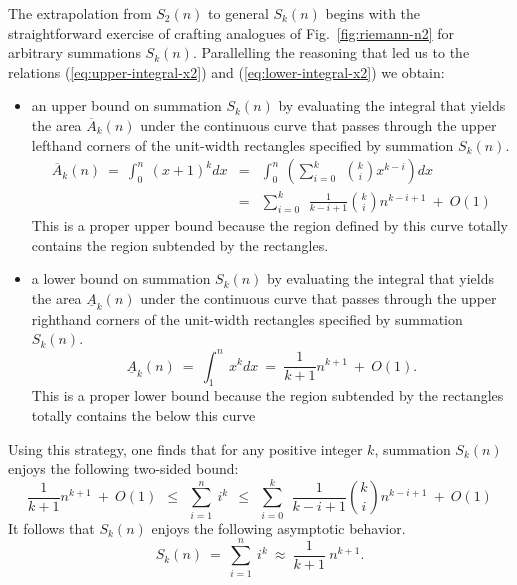 The extrapolation from $S_2(n)$ to general $S_k(n)$ begins with the
straightforward exercise of crafting analogues of
Fig.~\ref{fig:riemann-n2} for arbitrary summations $S_k(n)$.
Parallelling the reasoning that led us to the relations
(\ref{eq:upper-integral-x2}) and (\ref{eq:lower-integral-x2}) we
obtain:
\begin{itemize}
\item
an upper bound on summation $S_k(n)$ by evaluating the integral that
yields the area $\overline{A}_k(n)$ under the continuous curve that
passes through the upper lefthand corners of the unit-width rectangles
specified by summation $S_k(n)$.
\begin{eqnarray}
\label{eq:upper-integral-xk}
\overline{A}_k(n) \ = \
\int_0^n \ (x+1)^k dx & = &
\int_0^n \ \left(
\sum_{i=0}^k \ \ {k \choose i} x^{k-i} \right) dx \\
\nonumber
  & = &
\sum_{i=0}^k \ \ \frac{1}{k-i+1} {k \choose i} n^{k-i+1} \ + \ O(1)
\end{eqnarray}
This is a proper upper bound because the region defined by this curve
totally contains the region subtended by the rectangles.

\item
a lower bound on summation $S_k(n)$ by evaluating the integral that
yields the area $\underline{A}_k(n)$ under the continuous curve that
passes through the upper righthand corners of the unit-width
rectangles specified by summation $S_k(n)$.
\begin{equation}
\label{eq:lower-integral-xk}
\underline{A}_k(n) \ = \ 
\int_1^n \ x^k dx \ = \ \frac{1}{k+1} n^{k+1} \ + \ O(1).
\end{equation}
This is a proper lower bound because the region subtended by the
rectangles totally contains the below this curve
\end{itemize}

\noindent
Using this strategy, one finds that for any positive integer $k$,
summation $S_k(n)$ enjoys the following two-sided bound:
\begin{equation}
\label{eq:bounds-sum-xk}
\frac{1}{k+1} n^{k+1} \ + \ O(1)
  \ \ \leq \ \ \sum_{i=1}^n \ i^k
  \ \ \leq \ \ 
\sum_{i=0}^k \ \ \frac{1}{k-i+1} {k \choose i} n^{k-i+1} \ + \ O(1)
\end{equation}
It follows that $S_k(n)$ enjoys the following asymptotic behavior.
\begin{equation}
\label{eq:behavior-sum-xk}
S_k(n) \ = \
\sum_{i=1}^n \ i^k \ \approx \ \frac{1}{k+1} \ n^{k+1}.
\end{equation}


